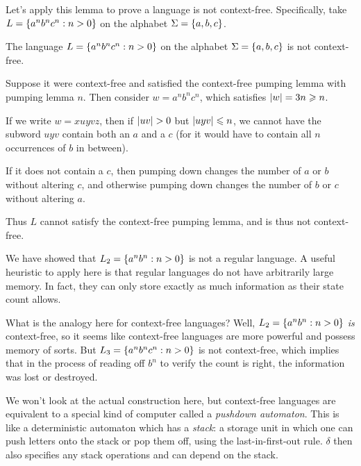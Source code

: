 \documentclass{article}
\begin{document}
Let's apply this lemma to prove a language is not context-free. Specifically, take $L = \left\lbrace a^n b^n c^n : n > 0 \right\rbrace$ on the alphabet $\Sigma = \left\lbrace a, b, c \right\rbrace$.

\begin{proposition}
	The language $L = \left\lbrace a^n b^n c^n : n > 0 \right\rbrace$ on the alphabet $\Sigma = \left\lbrace a, b, c \right\rbrace$ is not context-free.
\end{proposition}

\begin{prf}
	Suppose it were context-free and satisfied the context-free pumping lemma with pumping lemma $n$. Then consider $w = a^n b^n c^n$, which satisfies $\left\lvert w \right\rvert = 3n \geqslant n$.
\end{prf}

If we write $w = xuyvz$, then if $\left\lvert uv \right\rvert > 0$ but $\left\lvert uyv \right\rvert \leqslant n$, we cannot have the subword $uyv$ contain both an $a$ and a $c$ (for it would have to contain all $n$ occurrences of $b$ in between).

If it does not contain a $c$, then pumping down changes the number of $a$ or $b$ without altering $c$, and otherwise pumping down changes the number of $b$ or $c$ without altering $a$.

Thus $L$ cannot satisfy the context-free pumping lemma, and is thus not context-free.

\begin{remark}[Memory]
	\label{aside-on-memory}
	We have showed that $L_2 = \left\lbrace a^n b^n : n > 0 \right\rbrace$ is not a regular language. A useful heuristic to apply here is that regular languages do not have arbitrarily large memory. In fact, they can only store exactly as much information as their state count allows.
	    
	What is the analogy here for context-free languages? Well, $L_2 = \left\lbrace a^n b^n : n > 0 \right\rbrace$ \textit{is} context-free, so it seems like context-free languages are more powerful and possess memory of sorts. But $L_3 = \left\lbrace a^n b^n c^n : n > 0 \right\rbrace$ is not context-free, which implies that in the process of reading off $b^n$ to verify the count is right, the information was lost or destroyed.
	    
	We won't look at the actual construction here, but context-free languages are equivalent to a special kind of computer called a \textit{pushdown automaton}. This is like a deterministic automaton which has a \textit{stack}: a storage unit in which one can push letters onto the stack or pop them off, using the last-in-first-out rule. $\delta$ then also specifies any stack operations and can depend on the stack.
\end{remark}
\end{document}
